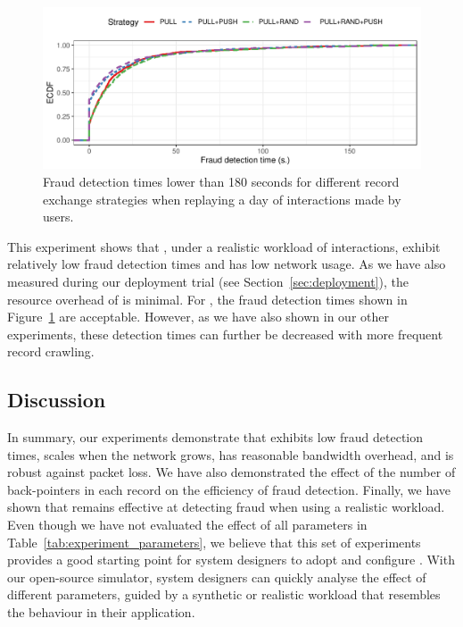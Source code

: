 \begin{figure}[t]
	\centering
	\includegraphics[width=\linewidth]{trustchain/assets/fraud_experiment_realistic_ecdf}
	\caption{Fraud detection times lower than 180 seconds for different record exchange strategies when replaying a day of interactions made by \Tribler{} users.}
	\label{fig:fraud_times_realistic_dataset}
\end{figure}

This experiment shows that \TrustChain{}, under a realistic workload of \Tribler{} interactions, exhibit relatively low fraud detection times and has low network usage.
As we have also measured during our deployment trial (see Section~\ref{sec:deployment}), the resource overhead of \TrustChain{} is minimal.
For \Tribler{}, the fraud detection times shown in Figure~\ref{fig:fraud_times_realistic_dataset} are acceptable.
However, as we have also shown in our other experiments, these detection times can further be decreased with more frequent record crawling.

\subsection{Discussion}
In summary, our experiments demonstrate that \TrustChain{} exhibits low fraud detection times, scales when the network grows, has reasonable bandwidth overhead, and is robust against packet loss.
We have also demonstrated the effect of the number of back-pointers in each record on the efficiency of fraud detection.
Finally, we have shown that \TrustChain{} remains effective at detecting fraud when using a realistic workload.
Even though we have not evaluated the effect of all parameters in Table~\ref{tab:experiment_parameters}, we believe that this set of experiments provides a good starting point for system designers to adopt and configure \TrustChain{}.
With our open-source simulator, system designers can quickly analyse the effect of different parameters, guided by a synthetic or realistic workload that resembles the behaviour in their application.


